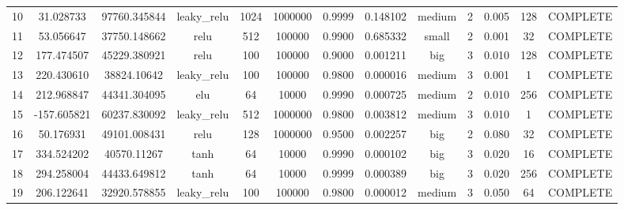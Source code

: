 \begin{longtable}{ccccccccccccc}
                       10 &                  31.028733 &                       97760.345844 &     leaky\_relu &        1024 &      1000000 & 0.9999 &       0.148102 &    medium &             2 & 0.005 &         128 & COMPLETE \\
                       11 &                  53.056647 &                       37750.148662 &            relu &         512 &       100000 & 0.9900 &       0.685332 &     small &             2 & 0.001 &          32 & COMPLETE \\
                       12 &                 177.474507 &                       45229.380921 &            relu &         100 &       100000 & 0.9000 &       0.001211 &       big &             3 & 0.010 &         128 & COMPLETE \\
                       13 &                 220.430610 &                        38824.10642 &     leaky\_relu &         100 &       100000 & 0.9800 &       0.000016 &    medium &             3 & 0.001 &           1 & COMPLETE \\
                       14 &                 212.968847 &                       44341.304095 &             elu &          64 &        10000 & 0.9990 &       0.000725 &    medium &             2 & 0.010 &         256 & COMPLETE \\
                       15 &                -157.605821 &                       60237.830092 &     leaky\_relu &         512 &      1000000 & 0.9800 &       0.003812 &    medium &             3 & 0.010 &           1 & COMPLETE \\
                       16 &                  50.176931 &                       49101.008431 &            relu &         128 &      1000000 & 0.9500 &       0.002257 &       big &             2 & 0.080 &          32 & COMPLETE \\
                       17 &                 334.524202 &                        40570.11267 &            tanh &          64 &        10000 & 0.9990 &       0.000102 &       big &             3 & 0.020 &          16 & COMPLETE \\
                       18 &                 294.258004 &                       44433.649812 &            tanh &          64 &        10000 & 0.9999 &       0.000389 &       big &             3 & 0.020 &         256 & COMPLETE \\
                       19 &                 206.122641 &                       32920.578855 &     leaky\_relu &         100 &       100000 & 0.9800 &       0.000012 &    medium &             3 & 0.050 &          64 & COMPLETE \\

\end{longtable}
